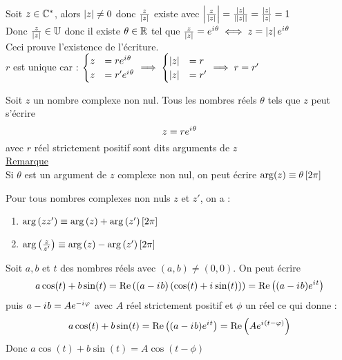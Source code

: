 \begin{dem}
	Soit \(z\in \mathbb{C}^*\), alors \(\left\lvert z\right\rvert \neq 0 \) donc \(\frac{z}{\left\lvert z\right\rvert}\) existe avec  \(\left\lvert\frac{z}{\left\lvert z\right\rvert}\right\rvert = \frac{\left\lvert z\right\rvert}{\left\lvert\left\lvert z\right\rvert\right\rvert} = \frac{\left\lvert z\right\rvert}{\left\lvert z\right\rvert} = 1\) \\
	Donc \(\frac{z}{\left\lvert z\right\rvert} \in \mathbb{U}\) donc il existe \(\theta \in \mathbb{R} \) tel que \(\frac{z}{\left\lvert z\right\rvert} = e^{i\mkern1mu \theta} \iff z = \left\lvert z\right\rvert e^{i\mkern1mu \theta}\) \\
	Ceci prouve l'existence de l'écriture. \\
	\(r\) est unique car : \(\begin{cases}
		z & = re^{i\mkern1mu \theta}  \\
		z & = r'e^{i\mkern1mu \theta}
	\end{cases} \implies \begin{cases}
		\left\lvert z\right\rvert & = r  \\
		\left\lvert z\right\rvert & = r'
	\end{cases} \implies r = r'\)
\end{dem}
\begin{defprop}[Arguments]
	Soit \(z\) un nombre complexe non nul. Tous les nombres réels \(\theta\) tels que \(z\) peut s'écrire \[z = re^{i\mkern1mu \theta}\] avec \(r\) réel strictement positif sont dits arguments de \(z\) \\
	\underline{Remarque}\\
	Si \(\theta\) est un argument de \(z\) complexe non nul, on peut écrire \(\arg(z) \equiv \theta\left[2\pi\right]\)
\end{defprop}

\begin{prop}
	Pour tous nombres complexes non nuls \(z\) et \(z'\), on a :
	\begin{enumerate}
		\item \(\arg\left(zz'\right) \equiv \arg\left(z\right)+\arg\left(z'\right)\left[2 \pi\right]\) \\
		\item \( \arg\left(\frac{z}{z'}\right) \equiv \arg\left(z\right)-\arg\left(z'\right)\left[2 \pi\right]\)
	\end{enumerate}
\end{prop}

\begin{defprop}
	Soit \(a, b\) et \(t\) des nombres réels avec \((a, b)\neq (0, 0)\). On peut écrire
	\[a\cos(t)+b\sin(t) = \operatorname{Re}\left(\left(a-i\mkern1mu b\right)\left(\cos(t)+i\mkern1mu \sin(t)\right)\right) = \operatorname{Re}\left((a-i\mkern1mu b)e^{i\mkern1mu t}\right) \]
	puis \(a-i\mkern1mu b = Ae^{-i\mkern1mu \varphi} \) avec \(A\) réel strictement positif et \(\phi\) un réel ce qui donne :
	\[a\cos(t)+b\sin(t) = \operatorname{Re}\left((a-i\mkern1mu b)e^{i\mkern1mu t}\right) = \operatorname{Re}\left(Ae^{i\mkern1mu(t-\varphi)}\right) \]
	Donc \(a\cos(t)+b\sin(t) = A\cos(t-\phi)\)
\end{defprop}

